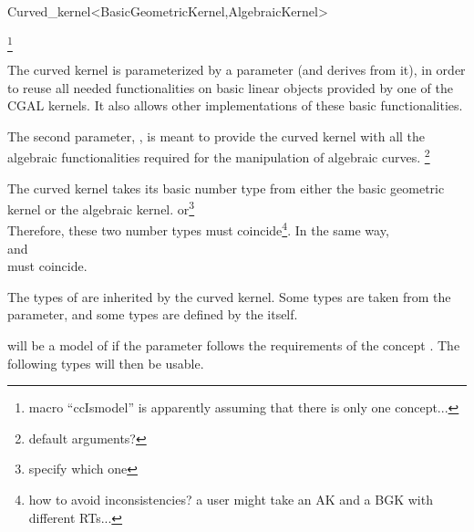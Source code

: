 \begin{ccRefClass}{Curved_kernel<BasicGeometricKernel,AlgebraicKernel>}

\ccDefinition


\footnote{macro ``ccIsmodel'' is apparently assuming that there is only one concept...}


\ccParameters

The curved kernel is parameterized by a  parameter
(and derives from it), in order to reuse all needed functionalities on
basic linear objects provided by one of the CGAL kernels. It also
allows other implementations of these basic functionalities.

The second parameter, , is meant to provide the
curved kernel with all the algebraic functionalities required for the
manipulation of algebraic curves. 
\footnote{default arguments?}

\ccInheritsFrom


\ccTypes

\ccThreeToTwo

The curved kernel takes its basic number type from either the basic geometric kernel or the algebraic kernel. 
or\footnote{specify which one}\\
Therefore, these two number types must coincide\footnote{how to avoid
inconsistencies? a user might take an AK and a BGK with different
RTs...}. In the same way,\\ 
and\\
must coincide. 


The types of  are inherited by the curved kernel.
Some types are taken from the  parameter, and
some types are defined by the  itself.

 will be a model of  if the 
 parameter follows the requirements of the 
concept . The following types will then be usable. 


\end{ccRefClass}
